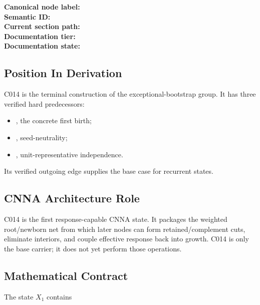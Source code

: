\textbf{Canonical node label:} \texttt{\protect{}}\\
\textbf{Semantic ID:} \texttt{\protect{}}\\
\textbf{Current section path:} \texttt{\protect{}}\\
\textbf{Documentation tier:} \texttt{\protect{}}\\
\textbf{Documentation state:} \texttt{\protect{}}

\subsection{Position In Derivation}\label{position-in-derivation-10}

C014 is the terminal construction of the exceptional-bootstrap group. It
has three verified hard predecessors:

\begin{itemize}
\tightlist
\item
  \texttt{\protect{}}, the concrete first birth;
\item
  \texttt{\protect{}}, seed-neutrality;
\item
  \texttt{\protect{}}, unit-representative
  independence.
\end{itemize}

Its verified outgoing edge \texttt{\protect{}}
supplies the base case for recurrent states.

\subsection{CNNA Architecture Role}\label{cnna-architecture-role-5}

C014 is the first response-capable CNNA state. It packages the weighted
root/newborn net from which later nodes can form retained/complement
cuts, eliminate interiors, and couple effective response back into
growth. C014 is only the base carrier; it does not yet perform those
operations.

\subsection{Mathematical Contract}\label{mathematical-contract-4}

The state \(X_1\) contains

